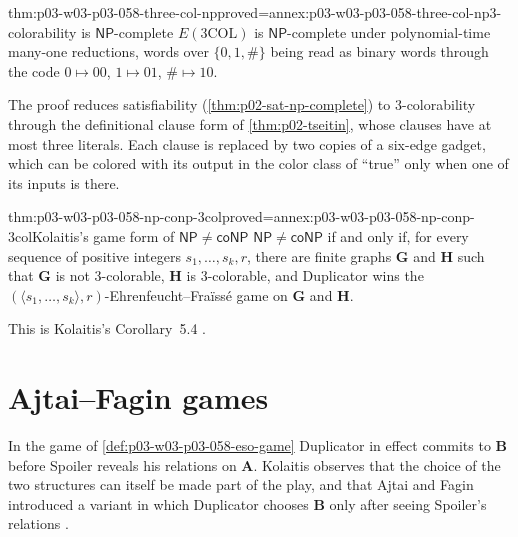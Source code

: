 \begin{hbtheorem}{thm:p03-w03-p03-058-three-col-np}{proved=annex:p03-w03-p03-058-three-col-np}{3-colorability is \(\mathsf{NP}\)-complete}
\(E(\mathrm{3COL})\) is \(\mathsf{NP}\)-complete under polynomial-time
many-one reductions, words over \(\{0,1,\#\}\) being read as binary words
through the code \(0\mapsto00\), \(1\mapsto01\), \(\#\mapsto10\).
\end{hbtheorem}

The proof reduces satisfiability (\cref{thm:p02-sat-np-complete}) to
3-colorability through the definitional clause form of
\cref{thm:p02-tseitin}, whose clauses have at most three literals. Each
clause is replaced by two copies of a six-edge gadget, which can be colored
with its output in the color class of ``true'' only when one of its inputs is
there.

\begin{hbcorollary}{thm:p03-w03-p03-058-np-conp-3col}{proved=annex:p03-w03-p03-058-np-conp-3col}{Kolaitis's game form of \(\mathsf{NP}\ne\mathsf{coNP}\)}
\(\mathsf{NP}\ne\mathsf{coNP}\) if and only if, for every sequence of
positive integers \(s_1,\ldots,s_k,r\), there are finite graphs
\(\mathbf G\) and \(\mathbf H\) such that \(\mathbf G\) is not 3-colorable,
\(\mathbf H\) is 3-colorable, and Duplicator wins the
\((\langle s_1,\ldots,s_k\rangle,r)\)-Ehrenfeucht--Fra\"iss\'e game on
\(\mathbf G\) and \(\mathbf H\).
\end{hbcorollary}

This is Kolaitis's Corollary~5.4
\cite[p.~27]{Kolaitis2003ExpressivePowerNotes}.

\section{Ajtai--Fagin games}
\label{sec:p03-w03-p03-058-af}

In the game of \cref{def:p03-w03-p03-058-eso-game} Duplicator in effect
commits to \(\mathbf B\) before Spoiler reveals his relations on
\(\mathbf A\). Kolaitis observes that the choice of the two structures can
itself be made part of the play, and that Ajtai and Fagin introduced a
variant in which Duplicator chooses \(\mathbf B\) only after seeing
Spoiler's relations \cite[p.~27]{Kolaitis2003ExpressivePowerNotes}.

